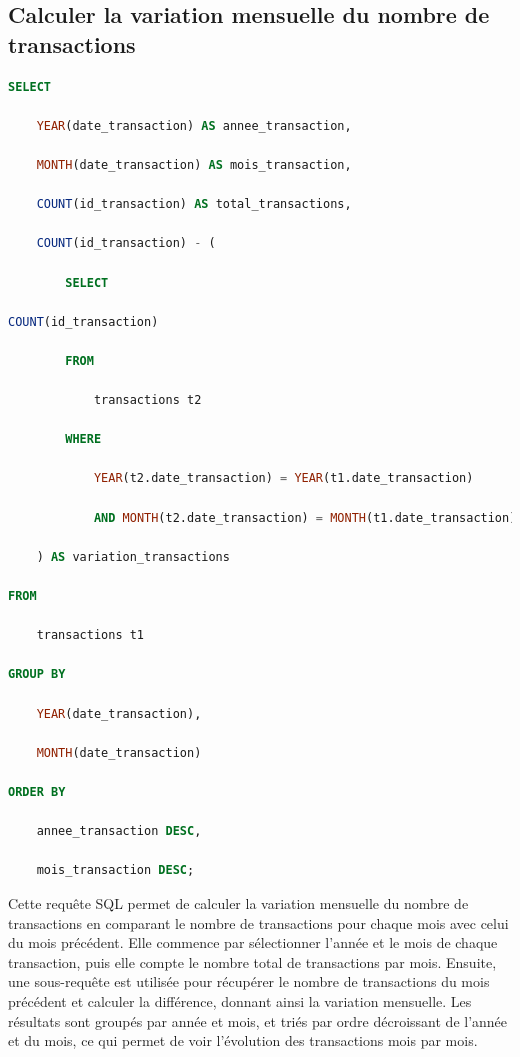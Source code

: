 \documentclass[12pt,a4paper]{article}
\begin{document}
	\subsection{Calculer la variation mensuelle du nombre de transactions}
\begin{lstlisting}[language=SQL]
SELECT 

    YEAR(date_transaction) AS annee_transaction, 

    MONTH(date_transaction) AS mois_transaction, 

    COUNT(id_transaction) AS total_transactions, 

    COUNT(id_transaction) - ( 

        SELECT 

COUNT(id_transaction) 

        FROM 

            transactions t2 

        WHERE 

            YEAR(t2.date_transaction) = YEAR(t1.date_transaction) 

            AND MONTH(t2.date_transaction) = MONTH(t1.date_transaction) - 1 

    ) AS variation_transactions 

FROM 

    transactions t1 

GROUP BY 

    YEAR(date_transaction), 

    MONTH(date_transaction) 

ORDER BY 

    annee_transaction DESC, 

    mois_transaction DESC; 
\end{lstlisting}

\vspace{.5cm}

Cette requête SQL permet de calculer la variation mensuelle du nombre de transactions en comparant le nombre de transactions pour chaque mois avec celui du mois précédent. Elle commence par sélectionner l'année et le mois de chaque transaction, puis elle compte le nombre total de transactions par mois. Ensuite, une sous-requête est utilisée pour récupérer le nombre de transactions du mois précédent et calculer la différence, donnant ainsi la variation mensuelle. Les résultats sont groupés par année et mois, et triés par ordre décroissant de l'année et du mois, ce qui permet de voir l'évolution des transactions mois par mois. 
\end{document}
